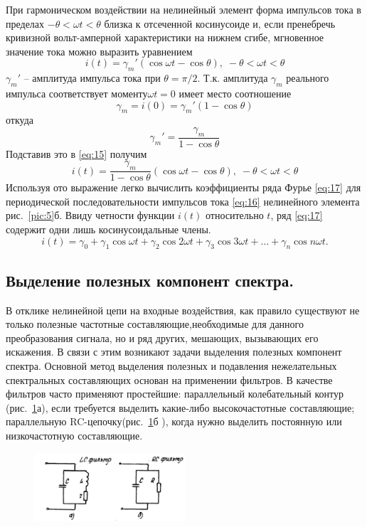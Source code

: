 При гармоническом воздействии на нелинейный элемент форма импульсов тока в пределах $-\theta<\omega t<\theta$ близка к отсеченной косинусоиде и, если пренебречь кривизной вольт-амперной характеристики на нижнем сгибе, мгновенное значение тока можно выразить уравнением
\begin{equation}
i(t)=\gamma_m'(\cos\omega t-\cos\theta),\;-\theta<\omega t<\theta
\label{eq:15}
\end{equation}
$\gamma_m'$ -- амплитуда импульса тока при $\theta=\pi/2$. 
Т.к. амплитуда $\gamma_m$ реального импульса соответствует моменту$\omega t=0$ имеет место соотношение
\begin{equation*}
\gamma_m=i(0)=\gamma_m'(1-\cos\theta)
\end{equation*}
откуда
\begin{equation*}
	\gamma_m'=\frac{\gamma_m}{1-\cos\theta}
\end{equation*}
Подставив это в \eqref{eq:15} получим
\begin{equation}
i(t)=\frac{\gamma_m}{1-\cos\theta}(\cos\omega t-\cos\theta),\;-\theta<\omega t<\theta
\label{eq:16}
\end{equation}
Используя ото выражение легко вычислить коэффициенты ряда Фурье \eqref{eq:17} для периодической последовательности импульсов тока \eqref{eq:16} нелинейного элемента рис.~\ref{pic:5}б. Ввиду четности функции $i(t)$ относительно $t$, ряд \eqref{eq:17} содержит одни лишь косинусоидальные члены.
\begin{equation}
i(t)=\gamma_0+\gamma_1\cos\omega t+\gamma_2\cos2\omega t+\gamma_3\cos3\omega t+\ldots+\gamma_n\cos n\omega t.
\label{eq:17}
\end{equation}
\subsection{Выделение полезных компонент спектра.}
В отклике нелинейной цепи на входные воздействия, как правило существуют не только полезные частотные составляющие,необходимые для данного преобразования сигнала, но и ряд других, мешающих, вызывающих его искажения. В связи с этим возникают задачи выделения полезных компонент спектра. Основной метод выделения полезных и подавления нежелательных спектральных составляющих основан на применении фильтров. В качестве фильтров часто
применяют простейшие: параллельный колебательный контур (рис.~\ref{fig:6}а), если требуется выделить какие-либо высокочастотные составляющие; параллельную RC-цепочку(рис.~\ref{fig:6}б ), когда нужно выделить постоянную или низкочастотную составляющие.
\begin{figure}
	\centering
	\vspace{-10pt}
	\includegraphics[width=0.5\textwidth]{picture/pic6.jpg}
	\vspace{-40pt}
	\caption{}
	\label{fig:6}
\end{figure}

